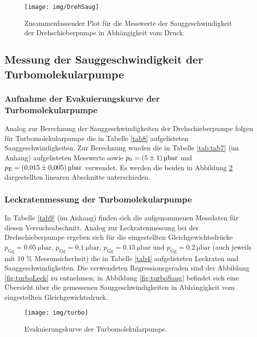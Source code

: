 \begin{figure}
	\centering
	\texttt{[image: img/DrehSaug]}
	\caption{Zusammenfassender Plot für die Messwerte der Sauggeschwindigkeit der Drehschieberpumpe in Abhängigkeit vom Druck.}
	\label{fig:drehSaug}
\end{figure}


\subsection{Messung der Sauggeschwindigkeit der Turbomolekularpumpe}

\subsubsection{Aufnahme der Evakuierungskurve der Turbomolekularpumpe}

Analog zur Berechnung der Sauggeschwindigkeiten der Drehschieberpumpe folgen für Turbomolekularpumpe die in Tabelle \ref{tab8} aufgelisteten Sauggeschwindigkeiten. Zur Berechnung wurden die in Tabelle \ref{tab:tab7} (im Anhang) aufgelisteten Messwerte sowie $p_0 = \SI{5 +- 1}{\micro \bar}$ und $p_\text{E} = \SI{0.015 +- 0.005}{\micro \bar}$ verwendet. Es werden die beiden in Abbildung \ref{fig:turbo} dargestellten linearen Abschnitte unterschieden. 

\subsubsection{Leckratenmessung der Turbomolekularpumpe}

In Tabelle \ref{tab9} (im Anhang) finden sich die aufgenommenen Messdaten für diesen Versuchsabschnitt. Analog zur Leckratenmessung bei der Drehschieberpumpe ergeben sich für die eingestellten Gleichgewichtsdrücke $p_\text{Gg} = \SI{0.05}{\micro \bar}$, $p_\text{Gg} = \SI{0.1}{\micro \bar}$, $p_\text{Gg} = \SI{0.15}{\micro \bar}$ und $p_\text{Gg} = \SI{0.2}{\micro \bar}$ (auch jeweils mit 10 \% Messunsicherheit) die in Tabelle \ref{tab4} aufgelisteten Leckraten und Sauggeschwindigkeiten. Die verwendeten Regressionsgeraden sind der Abbildung \ref{fig:turboLeck} zu entnehmen; in Abbildung \ref{fig:turboSaug} befindet sich eine Übersicht über die gemessenen Sauggeschwindigkeiten in Abhängigkeit vom eingestellten Gleichgewichtsdruck.




	 
\begin{figure}
	\centering
	\texttt{[image: img/turbo]}
	\caption{Evakuierungskurve der Turbomolekularpumpe.}
	\label{fig:turbo}
\end{figure}

